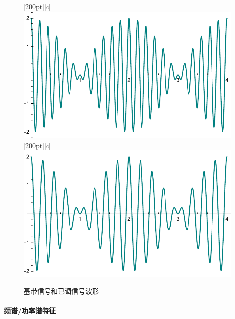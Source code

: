 \begin{figure}[H]
        [200pt][c]{\includegraphics[scale=0.5]{body/image/chap4SSBc.pdf}}
        [200pt][c]{\includegraphics[scale=0.5]{body/image/chap4SSBd.pdf}}
        \caption{基带信号和已调信号波形}
    \end{figure}

    \paragraph{频谱/功率谱特征}\mbox{}

